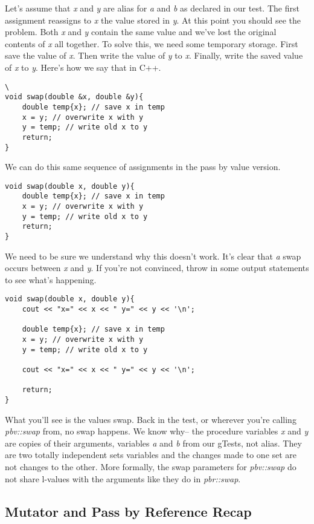 \documentclass[nobib]{tufte-handout}
\begin{document}
Let's assume that \textit{x} and \textit{y} are alias for \textit{a} and \textit{b} as declared in our test. The first assignment reassigns to \textit{x} the value stored in \textit{y}. At this point you should see the problem. Both \textit{x} and \textit{y} contain the same value and we've lost the original contents of \textit{x} all together. To solve this, we need some temporary storage. First save the value of \textit{x}. Then write the value of \textit{y} to \textit{x}. Finally, write the saved value of \textit{x} to \textit{y}. Here's how we say that in C++.
\begin{verbatim}\
void swap(double &x, double &y){
	double temp{x}; // save x in temp
	x = y; // overwrite x with y
	y = temp; // write old x to y
	return;
}
\end{verbatim}

We can do this same sequence of assignments in the pass by value version. 
\begin{verbatim}
void swap(double x, double y){
	double temp{x}; // save x in temp
	x = y; // overwrite x with y
	y = temp; // write old x to y
	return;
}
\end{verbatim}
We need to be sure we understand why this doesn't work.  It's clear that \textit{a} swap occurs between \textit{x} and \textit{y}.  If you're not convinced, throw in some output statements to see what's happening.
\begin{verbatim}
void swap(double x, double y){
	cout << "x=" << x << " y=" << y << '\n';

	double temp{x}; // save x in temp
	x = y; // overwrite x with y
	y = temp; // write old x to y

	cout << "x=" << x << " y=" << y << '\n';
	
	return;
}
\end{verbatim}
What you'll see is the values swap.  Back in the test, or wherever you're calling \textit{pbv::swap} from, no swap happens. We know why-- the procedure variables \textit{x} and \textit{y} are copies of their arguments, variables \textit{a} and \textit{b} from our gTests, not alias. They are two totally independent sets variables and the changes made to one set are not changes to the other.  More formally, the swap parameters for \textit{pbv::swap} do not share l-values with the arguments like they do in \textit{pbr::swap}.

\subsection{ Mutator and Pass by Reference Recap }
\end{document}
